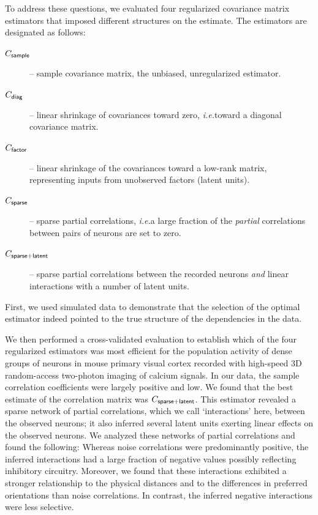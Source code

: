 \documentclass[10pt]{article}
\newcommand{\sq}[1]{\lq#1\rq}
\newcommand{\ie}{\emph{i.e.}\;}
\begin{document}
To address these questions, we evaluated four regularized covariance matrix estimators that imposed different structures on the estimate. The estimators are designated as follows:
\begin{description}
\item[$C_{\sf sample}$] -- sample covariance matrix, the unbiased, unregularized estimator.
\item[$C_{\sf diag}$] -- linear shrinkage of covariances toward zero, \ie toward a diagonal covariance matrix.
\item[$C_{\sf factor}$] -- linear shrinkage of the covariances toward a low-rank matrix, representing inputs from unobserved factors (latent units).
\item[$C_{\sf sparse}$] -- sparse partial correlations, \ie a large fraction of the \emph{partial} correlations between pairs of neurons are set to zero.
\item[$C_{\sf sparse+latent}$] -- sparse partial correlations between the recorded neurons \emph{and} linear interactions with a number of latent units.
\end{description} 

First, we used simulated data to demonstrate that the selection of the optimal estimator indeed pointed to the true structure of the dependencies in the data. 

We then performed a cross-validated evaluation to establish which of the four regularized estimators was most efficient for the population activity of dense groups of neurons in mouse primary visual cortex recorded with high-speed 3D random-access two-photon imaging of calcium signals. In our data, the sample correlation coefficients were largely positive and low.  We found that the best estimate of the correlation matrix was $C_{\sf sparse+latent}$.  This estimator revealed a sparse network of partial correlations, which we call \sq{interactions} here, between the observed neurons; it also inferred several latent units exerting linear effects on the observed neurons. We analyzed these networks of partial correlations and found the following: Whereas noise correlations were predominantly positive, the inferred interactions had a large fraction of negative values possibly reflecting inhibitory circuitry.  Moreover, we found that these interactions exhibited a stronger relationship to the physical distances and to the differences in preferred orientations than noise correlations. In contrast, the inferred negative interactions were less selective. 
\end{document}
